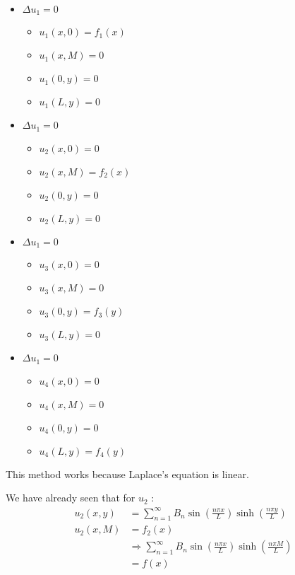 \begin{itemize}
  \item $\Delta u_1 = 0$
  \begin{itemize}
    \item $u_1(x, 0) = f_1(x)$
    \item $u_1(x, M) = 0$
    \item $u_1(0, y) = 0$
    \item $u_1(L, y) = 0$
  \end{itemize}
  \item $\Delta u_1 = 0$
  \begin{itemize}
    \item $u_2(x, 0) = 0$
    \item $u_2(x, M) = f_2(x)$
    \item $u_2(0, y) = 0$
    \item $u_2(L, y) = 0$
  \end{itemize}
  \item $\Delta u_1 = 0$
  \begin{itemize}
    \item $u_3(x, 0) = 0$
    \item $u_3(x, M) = 0$
    \item $u_3(0, y) = f_3(y)$
    \item $u_3(L, y) = 0$
  \end{itemize}
  \item $\Delta u_1 = 0$
  \begin{itemize}
    \item $u_4(x, 0) = 0$
    \item $u_4(x, M) = 0$
    \item $u_4(0, y) = 0$
    \item $u_4(L, y) = f_4(y)$
  \end{itemize}
\end{itemize}

This method works because Laplace's equation is linear.

We have already seen that for $u_2$ :
%
\begin{align}
  u_2(x, y) & = \sum^\infty_{n = 1} B_n \sin\left( \frac{n \pi x}{L} \right) \sinh\left( \frac{n \pi y}{L} \right)\\
  u_2(x, M) & = f_2(x)\\
  & \Rightarrow \sum^\infty_{n = 1} B_n \sin\left ( \frac{n \pi x}{L} \right) \sinh\left( \frac{n \pi M}{L} \right)\\
  & = f(x)
\end{align}

